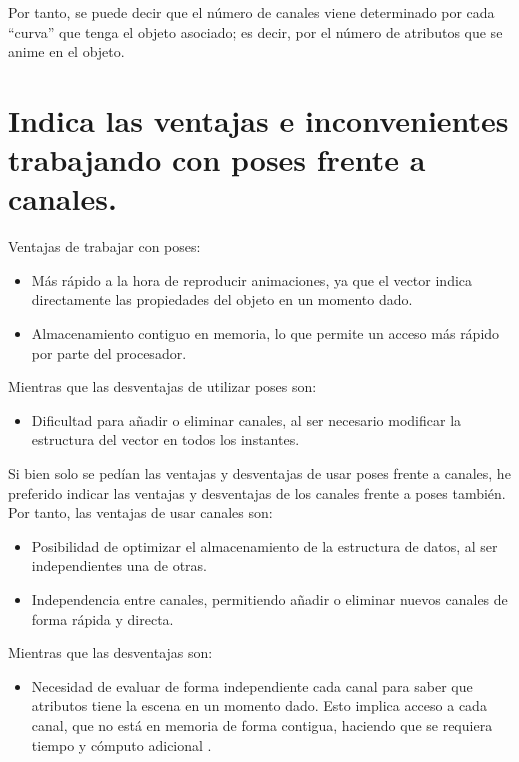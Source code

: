 \documentclass{article}
\begin{document}
\bigskip

Por tanto, se puede decir que el número de canales viene determinado por cada ``curva'' que tenga el objeto asociado; es decir, por el número de atributos que se anime en el objeto.


\section{Indica las ventajas e inconvenientes trabajando con poses frente a canales.}

Ventajas de trabajar con poses: 

\begin{itemize}
    \item Más rápido a la hora de reproducir animaciones, ya que el vector indica directamente las propiedades del objeto en un momento dado.
    \item Almacenamiento contiguo en memoria, lo que permite un acceso más rápido por parte del procesador.
\end{itemize}

\bigskip

Mientras que las desventajas de utilizar poses son:

\begin{itemize}
    \item Dificultad para añadir o eliminar canales, al ser necesario modificar la estructura del vector en todos los instantes.
\end{itemize}

\bigskip
\newpage

Si bien solo se pedían las ventajas y desventajas de usar poses frente a canales, he preferido indicar las ventajas y desventajas de los canales frente a poses también. Por tanto, las ventajas de usar canales son:

\begin{itemize}
    \item Posibilidad de optimizar el almacenamiento de la estructura de datos, al ser independientes una de otras.
    \item Independencia entre canales, permitiendo añadir o eliminar nuevos canales de forma rápida y directa.
\end{itemize}

\bigskip

Mientras que las desventajas son:

\begin{itemize}
    \item Necesidad de evaluar de forma independiente cada canal para saber que atributos tiene la escena en un momento dado. Esto implica acceso a cada canal, que no está en memoria de forma contigua, haciendo que se requiera tiempo y cómputo adicional \cite{diapos}.
\end{itemize}
\end{document}
